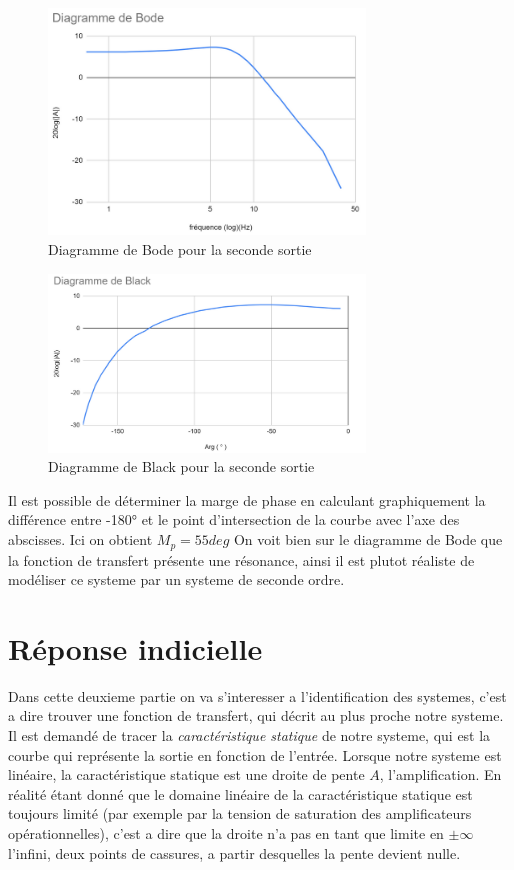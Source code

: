 \documentclass[12pt, a4paper]{report}
\begin{document}
\begin{figure}[H]
    \centering
    \includegraphics[width=0.75\textwidth]{bode2.png}
    \caption{Diagramme de Bode pour la seconde sortie}
    \label{fig:diagBlack1}
\end{figure}
\begin{figure}[H]
    \centering
    \includegraphics[width=0.75\textwidth]{black2.png}
    \caption{Diagramme de Black pour la seconde sortie}
    \label{fig:diagBlack1}
\end{figure}

Il est possible de déterminer la marge de phase en calculant graphiquement la différence entre -180° et le point d'intersection de la courbe avec l'axe des abscisses. Ici on obtient $M_p = 55deg$
On voit bien sur le diagramme de Bode que la fonction de transfert présente une résonance, ainsi il est plutot réaliste de modéliser
ce systeme par un systeme de seconde ordre.
\section{Réponse indicielle}

\par
Dans cette deuxieme partie on va s'interesser a l'identification des systemes, c'est a dire 
trouver une fonction de transfert, qui décrit au plus proche notre systeme. Il est demandé de tracer
la \textit{caractéristique statique} de notre systeme, qui est la courbe qui représente la sortie
en fonction de l'entrée. Lorsque notre systeme est linéaire, la caractéristique statique est
une droite de pente $A$, l'amplification. En réalité étant donné que le domaine linéaire de la caractéristique statique est
toujours limité (par exemple par la tension de saturation des amplificateurs opérationnelles), c'est a dire 
que la droite n'a pas en tant que limite en $\pm \infty$ l'infini, deux points de cassures, a partir desquelles
la pente devient nulle.
\end{document}
